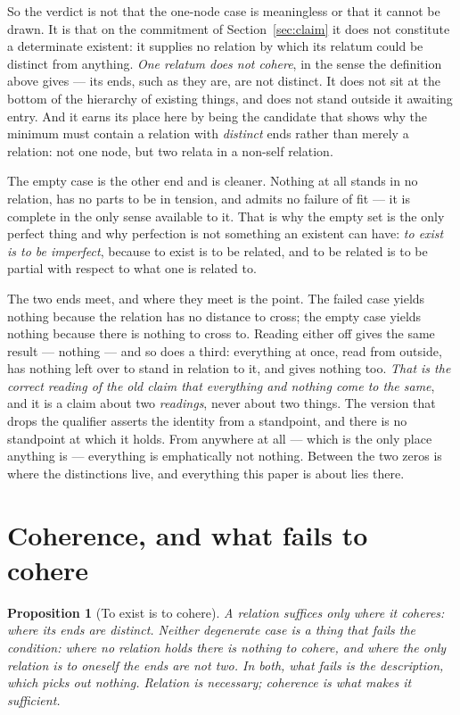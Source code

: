 \documentclass[11pt,a4paper]{article}
\newtheorem{proposition}{Proposition}
\begin{document}
So the verdict is not that the one-node case is meaningless or that it cannot be drawn. It is that on
the commitment of Section~\ref{sec:claim} it does not constitute a determinate existent: it supplies
no relation by which its relatum could be distinct from anything. \emph{One relatum does not cohere},
in the sense the definition above gives --- its ends, such as they are, are not distinct. It does not
sit at the bottom of the hierarchy of existing things, and does not stand outside it awaiting entry. And it earns its place here
by being the candidate that shows why the minimum must contain a relation with \emph{distinct} ends
rather than merely a relation: not one node, but two relata in a non-self relation.

The empty case is the other end and is cleaner. Nothing at all stands in no relation, has no parts to be
in tension, and admits no failure of fit --- it is complete in the only sense available to it. That is
why the empty set is the only perfect thing and why perfection is not something an existent can have:
\emph{to exist is to be imperfect}, because to exist is to be related, and to be related is to be
partial with respect to what one is related to.

The two ends meet, and where they meet is the point. The failed case yields nothing because the
relation has no distance to cross; the empty case yields nothing because there is nothing to cross to.
Reading either off gives the same result --- nothing --- and so does a third: everything at once, read
from outside, has nothing left over to stand in relation to it, and gives nothing too. \emph{That is the
correct reading of the old claim that everything and nothing come to the same}, and it is a claim about
two \emph{readings}, never about two things. The version that drops the qualifier asserts the identity
from a standpoint, and there is no standpoint at which it holds. From anywhere at all --- which is the
only place anything is --- everything is emphatically not nothing. Between the two zeros is where the
distinctions live, and everything this paper is about lies there.

\section{Coherence, and what fails to cohere}\label{sec:cohere}
\begin{proposition}[To exist is to cohere]\label{prop:cohere}
A relation suffices only where it \emph{coheres}: where its ends are distinct. Neither degenerate case
is a thing that fails the condition: where no relation holds there is nothing to cohere, and where the
only relation is to oneself the ends are not two. In both, what fails is the \emph{description}, which
picks out nothing. Relation is necessary; coherence is what makes it sufficient.
\end{proposition}
\end{document}
